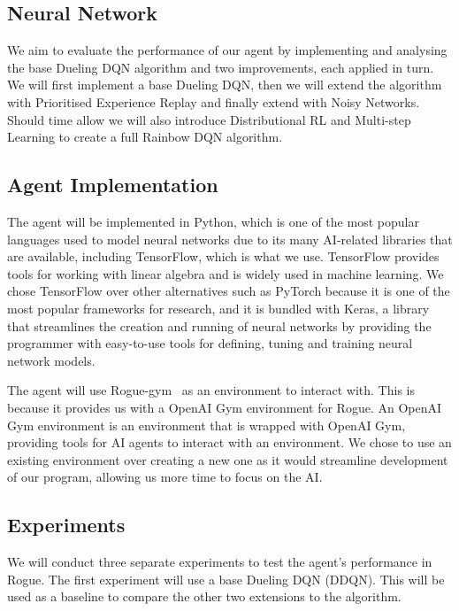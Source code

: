 \documentclass[12pt,a4paper]{article}
\begin{document}
    \subsection{Neural Network}\label{subsec:neural-network}
    We aim to evaluate the performance of our agent by implementing and analysing the base Dueling DQN algorithm and two improvements, each applied in turn.
    We will first implement a base Dueling DQN, then we will extend the algorithm with Prioritised Experience Replay and finally extend with Noisy Networks.
    Should time allow we will also introduce Distributional RL and Multi-step Learning to create a full Rainbow DQN algorithm.

    \subsection{Agent Implementation}\label{subsec:implementation}
    The agent will be implemented in Python, which is one of the most popular languages used to model neural networks due to its many AI-related libraries that are available, including TensorFlow, which is what we use.
    TensorFlow provides tools for working with linear algebra and is widely used in machine learning.
    We chose TensorFlow over other alternatives such as PyTorch because it is one of the most popular frameworks for research,
    and it is bundled with Keras, a library that streamlines the creation and running of neural networks by providing the programmer with
    easy-to-use tools for defining, tuning and training neural network models.

    The agent will use Rogue-gym~\citep{kanagawa19} as an environment to interact with.
    This is because it provides us with a OpenAI Gym environment for Rogue.
    An OpenAI Gym environment is an environment that is wrapped with OpenAI Gym, providing tools for AI agents to interact with an environment.
    We chose to use an existing environment over creating a new one as it would streamline development of our program, allowing us more time to focus on the AI.
    
    \subsection{Experiments}\label{subsec:experiments}
    We will conduct three separate experiments to test the agent's performance in Rogue.
    The first experiment will use a base Dueling DQN (DDQN).
    This will be used as a baseline to compare the other two extensions to the algorithm.
\end{document}
